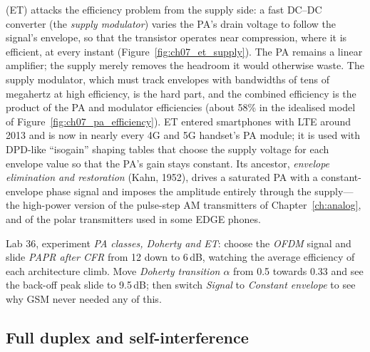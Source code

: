  (ET) attacks the efficiency problem from the supply side: a fast DC--DC
converter (the \emph{supply modulator}) varies the PA's drain voltage to follow the signal's envelope,
so that the transistor operates near compression, where it is efficient, at every instant
(Figure~\ref{fig:ch07_et_supply}). The PA remains a linear amplifier; the supply merely removes the
headroom it would otherwise waste. The supply modulator, which must track envelopes with bandwidths of
tens of megahertz at high efficiency, is the hard part, and the combined efficiency is the product of
the PA and modulator efficiencies (about 58\% in the idealised model of Figure~\ref{fig:ch07_pa_efficiency}).
ET entered smartphones with LTE around 2013 and is now in nearly every 4G and 5G handset's PA module; it
is used with DPD-like ``isogain'' shaping tables that choose the supply voltage for each envelope value
so that the PA's gain stays constant. Its ancestor, \emph{envelope elimination and restoration} (Kahn,
1952), drives a saturated PA with a constant-envelope phase signal and imposes the amplitude entirely
through the supply---the high-power version of the pulse-step AM transmitters of
Chapter~\ref{ch:analog}, and of the polar transmitters used in some EDGE phones.


\begin{tryit}
Lab 36, experiment \emph{PA classes, Doherty and ET}: choose the \emph{OFDM} signal and slide
\emph{PAPR after CFR} from 12 down to 6\,dB, watching the average efficiency of each architecture
climb. Move \emph{Doherty transition $\alpha$} from 0.5 towards 0.33 and see the back-off peak slide to
9.5\,dB; then switch \emph{Signal} to \emph{Constant envelope} to see why GSM never needed any of this.
\end{tryit}

\subsection{Full duplex and self-interference}
\label{sec:ch07:fullduplex}

